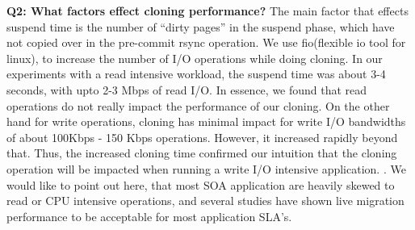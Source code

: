 \fi

\textbf{ Q2: What factors effect cloning performance? }
The main factor that effects suspend time is the number of ``dirty pages'' in the suspend phase, which have not copied over in the pre-commit rsync operation.
We use fio(flexible io tool for linux)\cite{fio}, to increase the number of I/O operations while doing cloning. 
In our experiments with a read intensive workload, the suspend time was about 3-4 seconds, with upto 2-3 Mbps of read I/O. 
In essence, we found that read operations do not really impact the performance of our cloning. 
On the other hand for write operations, cloning has minimal impact for write I/O bandwidths of about 100Kbps - 150 Kbps operations. 
However, it increased rapidly beyond that. Thus, the increased cloning time confirmed our intuition that the cloning operation will be impacted when running a write I/O intensive application.
.
We would like to point out here, that most SOA application are heavily skewed to read or CPU intensive operations, and several studies have shown live migration performance to be acceptable\cite{vmperformance} for most application SLA's. 
